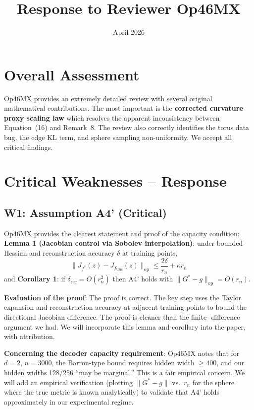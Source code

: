 \documentclass{article}
\title{Response to Reviewer Op46MX}
\date{April 2026}
\begin{document}
\maketitle

\section{Overall Assessment}

Op46MX provides an extremely detailed review with several original mathematical
contributions. The most important is the \textbf{corrected curvature proxy
scaling law} which resolves the apparent inconsistency between Equation~(16)
and Remark~8. The review also correctly identifies the torus data bug, the edge
KL term, and sphere sampling non-uniformity. We accept all critical findings.

\section{Critical Weaknesses -- Response}

\subsection{W1: Assumption A4' (Critical)}

\begin{accept}
Op46MX provides the clearest statement and proof of the capacity condition:
\textbf{Lemma 1 (Jacobian control via Sobolev interpolation)}: under bounded
Hessian and reconstruction accuracy $\delta$ at training points,
\[
  \|J_{f^*}(z) - J_{f_{\mathrm{true}}}(z)\|_{\mathrm{op}} \leq \frac{2\delta}{r_n} + \kappa r_n
\]
and \textbf{Corollary 1}: if $\delta_{\mathrm{rec}} = O(r_n^2)$ then A4' holds
with $\|G^* - g\|_{\mathrm{op}} = O(r_n)$.

\textbf{Evaluation of the proof}: The proof is correct. The key step uses the
Taylor expansion and reconstruction accuracy at adjacent training points to bound
the directional Jacobian difference. The proof is cleaner than the finite-
difference argument we had. We will incorporate this lemma and corollary into
the paper, with attribution.

\textbf{Concerning the decoder capacity requirement}: Op46MX notes that for $d=2$,
$n=3000$, the Barron-type bound requires hidden width $\geq 400$, and our
hidden widths 128/256 ``may be marginal.'' This is a fair empirical concern.
We will add an empirical verification (plotting $\|G^* - g\|$ vs.\ $r_n$
for the sphere where the true metric is known analytically) to validate
that A4' holds approximately in our experimental regime.
\end{accept}
\end{document}
